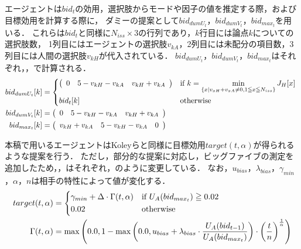 エージェントは$bid_t$の効用，選択肢からモードや因子の値を推定する際，および目標効用を計算する際に，
ダミーの提案として$bid_{dumU_t}$，$bid_{dumV_t}$，$bid_{max_t}$を用いる．
これらは$bid_t$と同様に$N_{iss} \times 3$の行列であり，$k$行目には論点$k$についての選択肢数，
1列目にはエージェントの選択肢$v_{kA}$，2列目には未配分の項目数，3列目には人間の選択肢$v_{kH}$が代入されている．
$bid_{dumU_t}$，$bid_{dumV_t}$，$bid_{max_t}$はそれぞれ，，で計算される．
\begin{align}
    bid_{dumU_t}[k] &= 
    \begin{cases*}
        \left(
    \begin{array}{rrr}
        0 & 5 - v_{kH} - v_{kA} & v_{kH} + v_{kA}
    \end{array}
    \right) & if $k = \displaystyle \min_{\{x | v_{xH} + v_{xA} \neq 0, 1 \leqq x \leqq N_{iss} \} } J_H[x]$ \\
        bid_t[k] & otherwise
    \end{cases*}
    \label{eq:dummyutil} \\
    bid_{dumV_t}[k] &= 
        \left(
    \begin{array}{rrr}
        0 & 5 - v_{kH} - v_{kA} & v_{kH} + v_{kA}
    \end{array}
    \right)
    \label{eq:dummyvalue} \\
    bid_{max_t}[k] &= 
        \left(
    \begin{array}{rrr}
        v_{kH} + v_{kA} & 5 - v_{kH} - v_{kA} & 0
    \end{array}
    \right)
    \label{eq:maxutil} 
\end{align}

本稿で用いるエージェントはKoleyらと同様に目標効用$target(t,\alpha)$が得られるような提案を行う．
ただし，部分的な提案に対応し，ビッグファイブの測定を追加したため，，はそれぞれ，のように変更している．
なお，$u_{bias}$，$\lambda_{bias}$，$\gamma_{min}$，$\alpha$，$n$は相手の特性によって値が変化する．
\begin{align}
    target(t,\alpha) &= 
    \begin{cases*}
        \gamma_{min} + \Delta \cdot \Gamma(t,\alpha) & if $U_A(bid_{max_t}) \geqq 0.02$  \\
        0.02 & otherwise 
    \end{cases*} \label{eq:newtarget}\\
    \Gamma(t,\alpha) &= \max \left( 0.0, 1 - \max \left( 0.0, u_{bias} + \lambda_{bias} \cdot \frac{U_A(bid_{t - 1})}{U_A(bid_{max_t})} \right) \cdot \left( \frac{t}{n} \right)^{\frac{1}{\alpha}} \right) \label{eq:newgamma}
\end{align}

